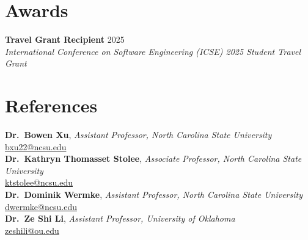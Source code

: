 \documentclass[11pt,a4paper]{article}
\newcommand{\refperson}[3]{%
  \noindent\textbf{#1}, \textit{#2}\\
  \href{mailto:#3}{#3}\vspace{4pt}\\
}
\begin{document}
\section*{Awards}
\noindent\textbf{Travel Grant Recipient} \hfill 2025\\
\textit{\color{muted}International Conference on Software Engineering (ICSE) 2025 Student Travel Grant}

\section*{References}
\refperson{Dr.\ Bowen Xu}{Assistant Professor, North Carolina State University}{bxu22@ncsu.edu}
\refperson{Dr.\ Kathryn Thomasset Stolee}{Associate Professor, North Carolina State University}{ktstolee@ncsu.edu}
\refperson{Dr.\ Dominik Wermke}{Assistant Professor, North Carolina State University}{dwermke@ncsu.edu}
\refperson{Dr.\ Ze Shi Li}{Assistant Professor, University of Oklahoma}{zeshili@ou.edu}
\end{document}
